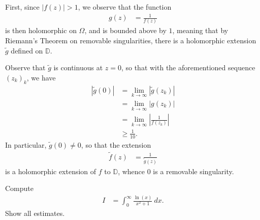 \documentclass[10pt]{mypackage}
\renewcommand{\D}{\mathbb{D}}
\begin{document}
\begin{solution}
  First, since $\left\vert f(z) \right\vert > 1$, we observe that the function
  \begin{align*}
    g(z) &= \frac{1}{f(z)}
  \end{align*}
  is then holomorphic on $\Omega$, and is bounded above by $1$, meaning that by Riemann's Theorem on removable singularities, there is a holomorphic extension $ \widetilde{g} $ defined on $\D$.%

  Observe that $ \widetilde{g} $ is continuous at $z = 0$, so that with the aforementioned sequence $\left( z_k \right)_k$, we have
  \begin{align*}
    \left\vert \widetilde{g}(0) \right\vert &= \lim_{k\rightarrow\infty} \left\vert \widetilde{g}\left( z_k \right) \right\vert\\
                                            &= \lim_{k\rightarrow\infty} \left\vert g\left( z_k \right) \right\vert\\
                                            &= \lim_{k\rightarrow\infty} \left\vert \frac{1}{f\left( z_k \right)} \right\vert\\
                                            &\geq \frac{1}{10}.
  \end{align*}
   In particular, $\widetilde{g}(0)\neq 0$, so that the extension
   \begin{align*}
     \widetilde{f}(z) &= \frac{1}{\widetilde{g}(z)}
   \end{align*}
   is a holomorphic extension of $f$ to $\D$, whence $0$ is a removable singularity.
\end{solution}
\begin{problem}[Problem 3]
  Compute
  \begin{align*}
    I &= \int_{0}^{\infty} \frac{\ln\left( x \right)}{x^2 + 1}\:dx.
  \end{align*}
  Show all estimates.
\end{problem}
\end{document}
